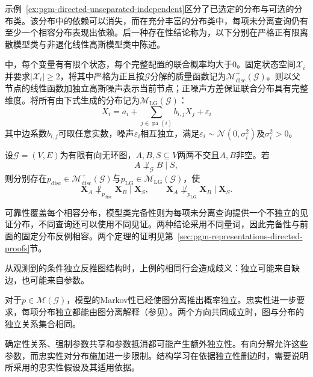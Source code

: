 示例~\ref{ex:pgm-directed-unseparated-independent}区分了已选定的分布与可选的分布类。该分布中的依赖可以消失，而在充分丰富的分布类中，每项未分离查询仍有至少一个相容分布表现出依赖。后一种存在性结论称为，以下分别在严格正有限离散模型类与非退化线性高斯模型类中陈述。

中，每个变量有有限个状态，每个完整配置的联合概率均大于$0$。固定状态空间$\mathcal{X}_i$并要求$|\mathcal{X}_i|\geq2$，将其中严格为正且按$\mathcal{G}$分解的质量函数记为$\mathcal{M}_{\mathrm{disc}}^{+}(\mathcal{G})$。则以父节点的线性函数加独立高斯噪声表示当前节点；正噪声方差保证联合分布具有完整维度。将所有由下式生成的分布记为$\mathcal{M}_{\mathrm{LG}}(\mathcal{G})$：
\[
  X_i=a_i+\sum_{j\in\operatorname{pa}(i)}b_{i,j}X_j+\varepsilon_i
\]
其中边系数$b_{i,j}$可取任意实数，噪声$\varepsilon_i$相互独立，满足$\varepsilon_i\sim\mathcal{N}(0,\sigma_i^2)$及$\sigma_i^2>0$。

\begin{theorem}[d-分离在特定模型类中的完备性]
  \label{thm:pgm-directed-completeness}
  设$\mathcal{G}=(V,E)$为有限有向无环图，$A,B,S\subseteq V$两两不交且$A,B$非空。若
  \[
    A\not\perp_{\mathcal{G}}B\mid S,
  \]
  则分别存在$p_{\mathrm{disc}}\in\mathcal{M}_{\mathrm{disc}}^{+}(\mathcal{G})$与$p_{\mathrm{LG}}\in\mathcal{M}_{\mathrm{LG}}(\mathcal{G})$，使
  \begin{equation}
    \bm{X}_A\not\perp_{p_{\mathrm{disc}}}\bm{X}_B\mid\bm{X}_S,
    \qquad
    \bm{X}_A\not\perp_{p_{\mathrm{LG}}}\bm{X}_B\mid\bm{X}_S.
    \label{eq:pgm-directed-completeness}
  \end{equation}
\end{theorem}

可靠性覆盖每个相容分布，模型类完备性则为每项未分离查询提供一个不独立的见证分布，不同查询还可以使用不同见证。两种结论采用不同量词，因此完备性与前面的固定分布反例相容。两个定理的证明见第~\ref{sec:pgm-representations-directed-proofs}节。

从观测到的条件独立反推图结构时，上例的相同行会造成歧义：独立可能来自缺边，也可能来自参数。

对于$p\in\mathcal{M}(\mathcal{G})$，模型的Markov性已经使图分离推出概率独立。忠实性进一步要求，每项分布独立都能由图分离解释（参见）。两个方向共同成立时，图与分布的独立关系集合相同。

确定性关系、强制参数共享和参数抵消都可能产生额外独立性。有向分解允许这些参数，而忠实性对分布施加进一步限制。结构学习在依据独立性删边时，需要说明所采用的忠实性假设及其适用依据。

